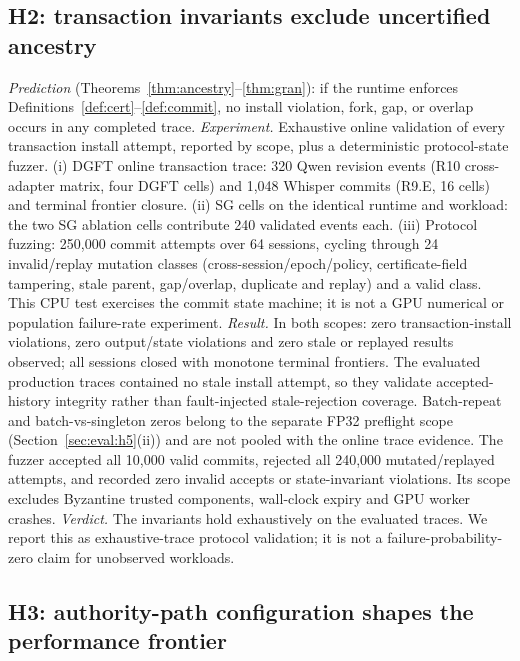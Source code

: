 \subsection{H2: transaction invariants exclude uncertified ancestry}
\label{sec:eval:h2}

\emph{Prediction} (Theorems~\ref{thm:ancestry}--\ref{thm:gran}): if the
runtime enforces Definitions~\ref{def:cert}--\ref{def:commit}, no install
violation, fork, gap, or overlap occurs in any completed trace.
\emph{Experiment.} Exhaustive online validation of every transaction install
attempt, reported by scope, plus a deterministic protocol-state fuzzer.
(i) DGFT online transaction trace: 320 Qwen revision events (R10
cross-adapter matrix, four DGFT cells) and 1{,}048 Whisper commits (R9.E,
16 cells) and terminal frontier closure.
(ii) SG cells on the identical runtime and workload: the two SG ablation
cells contribute 240 validated events each.
(iii) Protocol fuzzing: 250{,}000 commit attempts over 64 sessions, cycling
through 24 invalid/replay mutation classes (cross-session/epoch/policy,
certificate-field tampering, stale parent, gap/overlap, duplicate and replay)
and a valid class. This CPU test exercises the commit state machine; it is not
a GPU numerical or population failure-rate experiment.
\emph{Result.} In both scopes: zero transaction-install violations, zero
output/state violations and zero stale or replayed results observed; all
sessions closed with monotone terminal frontiers. The evaluated production
traces contained no stale install attempt, so they validate accepted-history
integrity rather than fault-injected stale-rejection coverage. Batch-repeat
and batch-vs-singleton zeros belong to the separate FP32 preflight scope
(Section~\ref{sec:eval:h5}(ii)) and are not pooled
with the online trace evidence.
The fuzzer accepted all 10{,}000 valid commits, rejected all 240{,}000
mutated/replayed attempts, and recorded zero invalid accepts or state-invariant
violations. Its scope excludes Byzantine trusted components, wall-clock
expiry and GPU worker crashes.
\emph{Verdict.} The invariants hold exhaustively on the evaluated traces.
We report this as exhaustive-trace protocol validation; it is not a
failure-probability-zero claim for unobserved workloads.

\subsection{H3: authority-path configuration shapes the performance frontier}
\label{sec:eval:h3}

